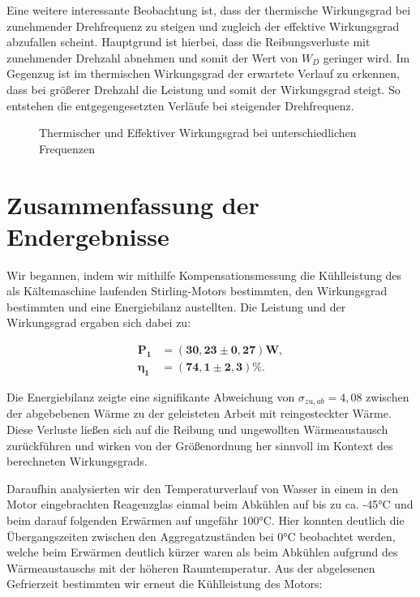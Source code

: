 \documentclass{article}
\begin{document}
Eine weitere interessante Beobachtung ist, dass der thermische Wirkungsgrad bei zunehmender Drehfrequenz zu steigen und zugleich der effektive Wirkungsgrad abzufallen scheint. Hauptgrund ist hierbei, dass die Reibungsverluste mit zunehmender Drehzahl abnehmen und somit der Wert von $W_D$ geringer wird. Im Gegenzug ist im thermischen Wirkungsgrad der erwartete Verlauf zu erkennen, dass bei größerer Drehzahl die Leistung und somit der Wirkungsgrad steigt. So entstehen die entgegengesetzten Verläufe bei steigender Drehfrequenz.  

\begin{figure}[!p]
    \centering
    \caption{Thermischer und Effektiver Wirkungsgrad bei unterschiedlichen Frequenzen}
    \label{fig:WirkungsgradePLT}
\end{figure}

\clearpage
\newpage
\section{Zusammenfassung der Endergebnisse}

Wir begannen, indem wir mithilfe Kompensationsmessung  die Kühlleistung des als Kältemaschine laufenden Stirling-Motors bestimmten, den Wirkungsgrad bestimmten und eine Energiebilanz austellten. Die Leistung und der Wirkungsgrad ergaben sich dabei zu:

\begin{equation}
    \begin{split}
        \bm{P_1} &= \bm{(30,23 \pm 0,27)} \textbf{W}, \\
        \bm{\eta_1} &= \bm{(74,1 \pm 2,3)} \%.
    \end{split}
\end{equation}

Die Energiebilanz zeigte eine signifikante Abweichung von $\sigma_{zu, ab} = 4,08$ zwischen der abgebebenen Wärme zu der geleisteten Arbeit mit reingesteckter Wärme. Diese Verluste ließen sich auf die Reibung und ungewollten Wärmeaustausch zurückführen und wirken von der Größenordnung her sinnvoll im Kontext des berechneten Wirkungsgrads.

Daraufhin analysierten wir den Temperaturverlauf von Wasser in einem in den Motor eingebrachten Reagenzglas einmal beim Abkühlen auf bis zu ca. -45°C und beim darauf folgenden Erwärmen auf ungefähr 100°C. Hier konnten deutlich die Übergangszeiten zwischen den Aggregatzuständen bei 0°C beobachtet werden, welche beim Erwärmen deutlich kürzer waren als beim Abkühlen aufgrund des Wärmeaustauschs mit der höheren Raumtemperatur. Aus der abgelesenen Gefrierzeit bestimmten wir erneut die Kühlleistung des Motors:
\end{document}
